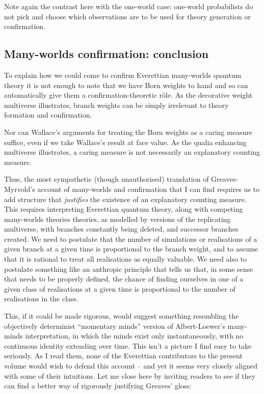 \documentclass[aps,
pra,epsfig]{revtex4}
\begin{document}
Note again the contrast here with the one-world case:
one-world probabilists do not pick and choose which observations 
are to be used for theory generation or confirmation.  

\subsection{Many-worlds confirmation: conclusion}

To explain how we could come to confirm Everettian many-worlds
quantum theory it is not enough to note that we have Born
weights to hand and so can automatically give them a 
confirmation-theoretic r\^{o}le.   As the decorative weight multiverse 
illustrates, branch weights can be simply irrelevant to 
theory formation and confirmation.   
  
Nor can Wallace's arguments for treating the 
Born weights as a caring measure suffice, even if we take Wallace's
result at face value.  As the qualia enhancing multiverse
illustrates, a caring measure is not necessarily an explanatory 
counting measure.  

Thus, the most sympathetic (though unauthorised) 
translation of Greaves-Myrvold's 
account of many-worlds and confirmation that I can find requires us
to add structure that {\it justifies} the existence of an 
explanatory counting measure.   This requires interpreting 
Everettian quantum theory, along with competing many-worlds theories
theories, as modelled by versions of the replicating multiverse,
with branches constantly being deleted, and successor branches
created.  We need to postulate that the number of 
simulations or realisations of a given branch at a given 
time is proportional to the branch weight, and to assume 
that it is rational to treat all realisations as equally valuable.
We need also to postulate something like an
anthropic principle that tells us that, in some sense that
needs to be properly defined, the chance of finding ourselves in 
one of a given class of realisations at a given time is proportional 
to the number of realisations in the class.  

This, if it could be made rigorous, would suggest something resembling 
the objectively determinist 
``momentary minds'' version of Albert-Loewer's many-minds 
interpretation\cite{almanyminds,bellmw,barbour}, 
in which the minds exist only instantaneously, with no continuous
identity extending over time.   This isn't a picture I find easy to take
seriously.    As I read them, none of the Everettian 
contributors to the present volume would 
wish to defend this account -- and yet it seems very closely aligned with 
some of their intuitions.  Let me close here by inviting 
readers to see if they can find a better
way of rigorously justifying Greaves' gloss:\cite{greaves}
\end{document}
